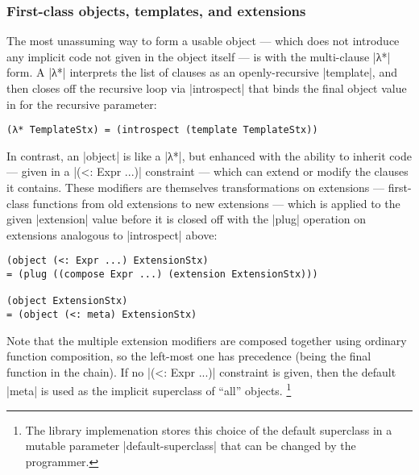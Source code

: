 \subsubsection{First-class objects, templates, and extensions}

The most unassuming way to form a usable object --- which does not introduce any implicit code not given in the object itself --- is with the multi-clause \scm|λ*| form.  A \scm|λ*| interprets the list of clauses as an openly-recursive \scm|template|, and then closes off the recursive loop via \scm|introspect| that binds the final object value in for the recursive parameter:
\begin{verbatim}
(λ* TemplateStx) = (introspect (template TemplateStx))
\end{verbatim}

In contrast, an \scm|object| is like a \scm|λ*|, but enhanced with the ability to inherit code --- given in a \scm|(<: Expr ...)| constraint --- which can extend or modify the clauses it contains.
These modifiers are themselves transformations on extensions --- first-class functions from old extensions to new extensions --- which is applied to the given \scm|extension| value before it is closed off with the \scm|plug| operation on extensions analogous to \scm|introspect| above:
\begin{verbatim}
(object (<: Expr ...) ExtensionStx)
= (plug ((compose Expr ...) (extension ExtensionStx)))

(object ExtensionStx)
= (object (<: meta) ExtensionStx)
\end{verbatim}
Note that the multiple extension modifiers are composed together using ordinary function composition, so the left-most one has precedence (being the final function in the chain).
If no \scm|(<: Expr ...)| constraint is given, then the default \scm|meta| is used as the implicit superclass of ``all'' objects.%
\footnote{The library implemenation stores this choice of the default superclass in a mutable parameter \scm|default-superclass| that can be changed by the programmer.}

